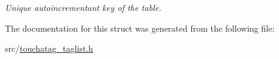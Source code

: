 \begin{DoxyCompactItemize}
\begin{DoxyCompactList}\small\item\em Unique autoincrementant key of the table. \item\end{DoxyCompactList}\end{DoxyCompactItemize}


The documentation for this struct was generated from the following file:\begin{DoxyCompactItemize}
\item 
src/\hyperlink{touchatag__taglist_8h}{touchatag\_\-taglist.h}\end{DoxyCompactItemize}
